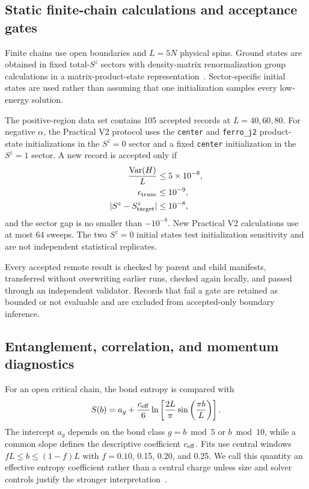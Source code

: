 \subsection{Static finite-chain calculations and acceptance gates}

Finite chains use open boundaries and $L=5N$ physical spins.
Ground states are obtained in fixed total-$S^z$ sectors with density-matrix renormalization group calculations in a matrix-product-state representation~\cite{white1992,schollwoeck2011}.
Sector-specific initial states are used rather than assuming that one initialization samples every low-energy solution.

The positive-region data set contains 105 accepted records at $L=40,60,80$.
For negative $\alpha$, the Practical V2 protocol uses the \texttt{center} and \texttt{ferro\_j2} product-state initializations in the $S^z=0$ sector and a fixed \texttt{center} initialization in the $S^z=1$ sector.
A new record is accepted only if
\begin{align}
\frac{\mathrm{Var}(H)}{L}&\leq5\times10^{-8}, \notag\\
\epsilon_{\mathrm{trunc}}&\leq10^{-9}, \notag\\
|S^z-S^z_{\mathrm{target}}|&\leq10^{-8},
\label{eq:gates}
\end{align}
and the sector gap is no smaller than $-10^{-8}$.
New Practical V2 calculations use at most 64 sweeps.
The two $S^z=0$ initial states test initialization sensitivity and are not independent statistical replicates.

Every accepted remote result is checked by parent and child manifests, transferred without overwriting earlier runs, checked again locally, and passed through an independent validator.
Records that fail a gate are retained as bounded or not evaluable and are excluded from accepted-only boundary inference.

\subsection{Entanglement, correlation, and momentum diagnostics}

For an open critical chain, the bond entropy is compared with
\begin{equation}
S(b)=a_g+\frac{c_{\mathrm{eff}}}{6}
\ln\left[\frac{2L}{\pi}\sin\left(\frac{\pi b}{L}\right)\right].
\label{eq:entropy}
\end{equation}
The intercept $a_g$ depends on the bond class $g=b\bmod 5$ or $b\bmod 10$, while a common slope defines the descriptive coefficient $c_{\mathrm{eff}}$.
Fits use central windows $fL\leq b\leq(1-f)L$ with $f=0.10$, 0.15, 0.20, and 0.25.
We call this quantity an effective entropy coefficient rather than a central charge unless size and solver controls justify the stronger interpretation~\cite{calabrese2004}.

